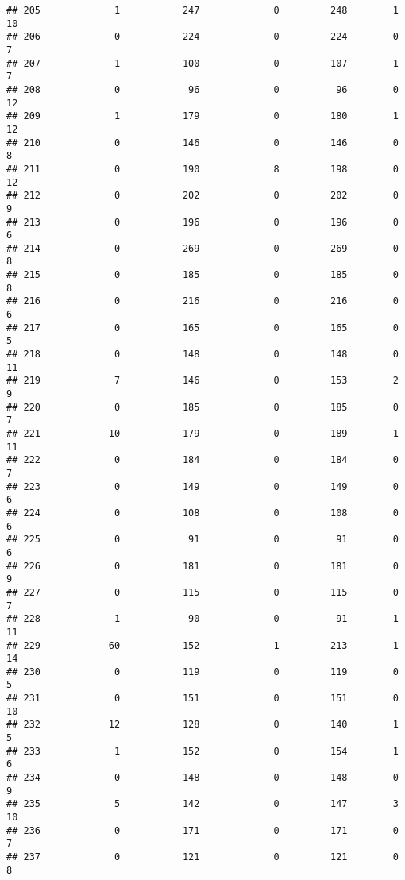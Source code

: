 \documentclass[]{article}
\begin{document}
\begin{verbatim}
## 205             1           247             0         248        1       10
## 206             0           224             0         224        0        7
## 207             1           100             0         107        1        7
## 208             0            96             0          96        0       12
## 209             1           179             0         180        1       12
## 210             0           146             0         146        0        8
## 211             0           190             8         198        0       12
## 212             0           202             0         202        0        9
## 213             0           196             0         196        0        6
## 214             0           269             0         269        0        8
## 215             0           185             0         185        0        8
## 216             0           216             0         216        0        6
## 217             0           165             0         165        0        5
## 218             0           148             0         148        0       11
## 219             7           146             0         153        2        9
## 220             0           185             0         185        0        7
## 221            10           179             0         189        1       11
## 222             0           184             0         184        0        7
## 223             0           149             0         149        0        6
## 224             0           108             0         108        0        6
## 225             0            91             0          91        0        6
## 226             0           181             0         181        0        9
## 227             0           115             0         115        0        7
## 228             1            90             0          91        1       11
## 229            60           152             1         213        1       14
## 230             0           119             0         119        0        5
## 231             0           151             0         151        0       10
## 232            12           128             0         140        1        5
## 233             1           152             0         154        1        6
## 234             0           148             0         148        0        9
## 235             5           142             0         147        3       10
## 236             0           171             0         171        0        7
## 237             0           121             0         121        0        8

\end{verbatim}
\end{document}
